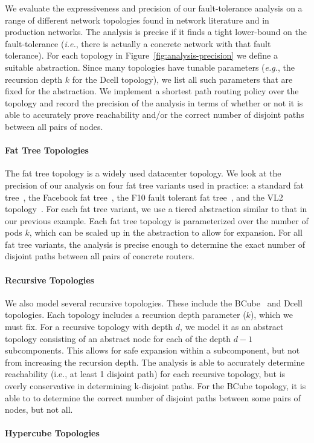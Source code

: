 \documentclass[numbers, 10pt, preprint]{sigplanconf}
\newcommand{\EG}{\emph{e.g.}}
\newcommand{\IE}{\emph{i.e.}}
\newcommand{\para}[1]{\paragraph*{\textbf{#1}}}
\begin{document}
We evaluate the expressiveness and precision of our fault-tolerance analysis on a range of different network topologies found in network literature and in production networks. The analysis is precise if it finds a tight lower-bound on the fault-tolerance (\IE, there is actually a concrete network with that fault tolerance).
For each topology in Figure~\ref{fig:analysis-precision} we define a suitable abstraction. Since many topologies have tunable parameters (\EG, the recursion depth $k$ for the Dcell topology), we list all such parameters that are fixed for the abstraction. We implement a shortest path routing policy over the topology and record the precision of the analysis in terms of whether or not it is able to accurately prove reachability and/or the correct number of disjoint paths between all pairs of nodes.

\para{Fat Tree Topologies}

The fat tree topology is a widely used datacenter topology. We look at the precision of our analysis on four fat tree variants used in practice: a standard fat tree~\cite{fattree}, the Facebook fat tree~\cite{facebook-fattree}, the F10 fault tolerant fat tree~\cite{f10-fattree}, and the VL2 topology~\cite{vl2-fattree}. For each fat tree variant, we use a tiered abstraction similar to that in our previous example. Each fat tree topology is parameterized over the number of pods $k$, which can be scaled up in the abstraction to allow for expansion. For all fat tree variants, the analysis is precise enough to determine the exact number of disjoint paths between all pairs of concrete routers.

\para{Recursive Topologies}

We also model several recursive topologies. These include the BCube~\cite{bcube} and Dcell~\cite{dcell} topologies. Each topology includes a recursion depth parameter ($k$), which we must fix. For a recursive topology with depth $d$, we model it as an abstract topology consisting of an abstract node for each of the depth $d-1$ subcomponents. This allows for safe expansion within a subcomponent, but not from increasing the recursion depth. The analysis is able to accurately determine reachability (i.e., at least 1 disjoint path) for each recursive topology, but is overly conservative in determining k-disjoint paths. For the BCube topology, it is able to to determine the correct number of disjoint paths between some pairs of nodes, but not all.

\para{Hypercube Topologies}
\end{document}
